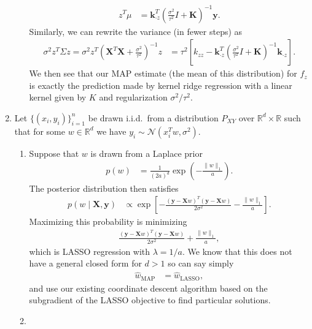 \documentclass[11pt,letterpaper]{article}
\newcommand{\R}{\mathbb{R}}
\theoremstyle{definition}
\theoremstyle{plain}
\newcommand{\prop}{\mathrel{\propto}}
\renewcommand{\vec}[1]{\bm{#1}}
\numberwithin{equation}{section}
\numberwithin{figure}{section}
\begin{document}
\begin{enumerate}
\begin{enumerate}
\begin{align*}
			z^T \mu &= \vec{k}_{\cdot z}^T \left(\frac{\sigma^2}{\tau^2} I + \vec{K}\right)^{-1} \!\!\! \vec{y}.
		\end{align*}
		Similarly, we can rewrite the variance (in fewer steps) as
		\begin{align*}
			\sigma^2 z^T \Sigma z = \sigma^2 z^T \left(\vec{X}^T \vec{X} + \tfrac{\sigma^2}{\tau^2}\right)^{-1} z &= \tau^2 \left[k_{zz} - \vec{k}_{\cdot z}^T \left(\tfrac{\sigma^2}{\tau^2} I + \vec{K}\right)^{-1}\vec{k}_{\cdot z}\right].
		\end{align*}
		We then see that our MAP estimate (the mean of this distribution) for $f_z$ is exactly the prediction made by kernel ridge regression with a linear kernel given by $K$ and regularization $\sigma^2/\tau^2$.
	\end{enumerate}






	\item Let $\{(x_i, y_i)\}_{i=1}^n$ be drawn i.i.d.\ from a distribution $P_{XY}$ over $\R^d \times \R$ such that for some $w \in \R^d$ we have $y_i \sim \mathcal{N}(x_i^T w, \sigma^2)$. 
	\begin{enumerate}
		\item Suppose that $w$ is drawn from a Laplace prior
		\begin{align*}
			p(w) &= \frac{1}{(2a)^d} \exp\left(-\frac{\|w\|_1}{a}\right).
		\end{align*}
		The posterior distribution then satisfies
		\begin{align*}
			p(w \mid \vec{X},\vec{y}) &\prop \exp\left[-\frac{(\vec{y} - \vec{X}w)^T(\vec{y} - \vec{X} w)}{2\sigma^2} - \frac{\|w\|_1}{a}\right].
		\end{align*}
		Maximizing this probability is minimizing
		\begin{align*}
			\frac{(\vec{y} - \vec{X}w)^T(\vec{y} - \vec{X} w)}{2\sigma^2} + \frac{\|w\|_1}{a},
		\end{align*}
		which is LASSO regression with $\lambda  = 1/a$. We know that this does not have a general closed form for $d>1$ so can say simply
		\begin{align*}
			\hat{w}_\mathrm{MAP} &= \hat{w}_\mathrm{LASSO},
		\end{align*}
		and use our existing coordinate descent algorithm based on the subgradient of the LASSO objective to find particular solutions.


		\item 
	\end{enumerate}
\end{enumerate}
\end{document}
